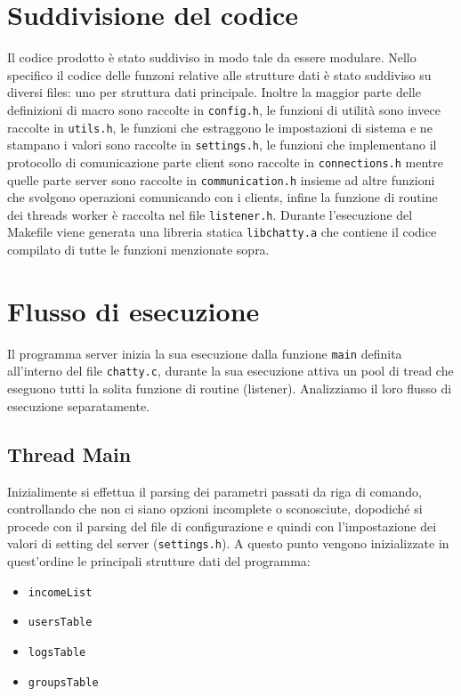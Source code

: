 \documentclass[a4paper,12pt]{report}
\begin{document}
\section*{Suddivisione del codice}
Il codice prodotto è stato suddiviso in modo tale da essere modulare. Nello specifico il codice delle funzoni relative alle strutture dati è stato suddiviso su diversi files: uno per struttura dati principale. Inoltre la maggior parte delle definizioni di macro sono raccolte in \texttt{config.h}, le funzioni di utilità sono invece raccolte in \texttt{utils.h}, le funzioni che estraggono le impostazioni di sistema e ne stampano i valori sono raccolte in \texttt{settings.h}, le funzioni che implementano il protocollo di comunicazione parte client sono raccolte in \texttt{connections.h} mentre quelle parte server sono raccolte in \texttt{communication.h} insieme ad altre funzioni che svolgono operazioni comunicando con i clients, infine la funzione di routine dei threads worker è raccolta nel file \texttt{listener.h}. Durante l'esecuzione del Makefile viene generata una libreria statica \texttt{libchatty.a} che contiene il codice compilato di tutte le funzioni menzionate sopra.

\section*{Flusso di esecuzione}
Il programma server inizia la sua esecuzione dalla funzione \texttt{main} definita all'interno del file \texttt{chatty.c}, durante la sua esecuzione attiva un pool di tread che eseguono tutti la solita funzione di routine (listener). Analizziamo il loro flusso di esecuzione separatamente.
\subsection*{Thread Main}
Inizialimente si effettua il parsing dei parametri passati da riga di comando, controllando che non ci siano opzioni incomplete o sconosciute, dopodiché si procede con il parsing del file di configurazione e quindi con l'impostazione dei valori di setting del server (\texttt{settings.h}). A questo punto vengono inizializzate in quest'ordine le principali strutture dati del programma:
\begin{itemize}
\item \texttt{incomeList}
\item \texttt{usersTable}
\item \texttt{logsTable}
\item \texttt{groupsTable}
\end{itemize}
\end{document}
